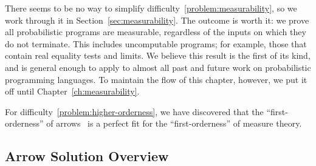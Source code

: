 There seems to be no way to simplify difficulty~\ref{problem:measurability}, so we work through it in Section~\ref{sec:measurability}.
The outcome is worth it: we prove all probabilistic programs are measurable, regardless of the inputs on which they do not terminate.
This includes uncomputable programs; for example, those that contain real equality tests and limits.
We believe this result is the first of its kind, and is general enough to apply to almost all past and future work on probabilistic programming languages.
To maintain the flow of this chapter, however, we put it off until Chapter~\ref{ch:measurability}.

For difficulty~\ref{problem:higher-orderness}, we have discovered that the ``first-orderness'' of arrows~\cite{cit:hughes-2000scp-arrows} is a perfect fit for the ``first-orderness'' of measure theory.


\subsection{Arrow Solution Overview}

\newcommand{\youarehere}[1]%
{%
\begin{equation}%
\begin{CD}%
X \botto Y   @>\liftmap>>   X \mapto Y   @>\liftpre>>   X \preto Y \\%
@V{\eta_\pbot}VV             @VV{\eta\pmap}V              @VV{\eta\ppre}V\\%
X \pbotto Y  @>>\liftpmap>  X \pmapto Y  @>>\liftppre>  X \ppreto Y%
\end{CD}%
\label{#1}%
\end{equation}%
}

